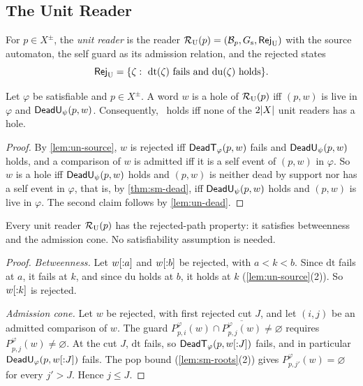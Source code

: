 \subsection{The Unit Reader}\label{sec:un-reader}

\begin{definition}\label{def:un-reader}
For $p\in X^\pm$, the \emph{unit reader} is the reader
$\mathcal R_{\mathrm U}(p)=(\mathcal B_p,G_{\mathrm{s}},\mathsf{Rej}_{\mathrm U})$ with the source automaton, the
self guard as its admission relation, and the rejected states
\[
 \mathsf{Rej}_{\mathrm U}=\{\zeta:\ \mathrm{dt}(\zeta)\text{ fails and }
 \mathrm{du}(\zeta)\text{ holds}\}.
\]
\end{definition}

\begin{lemma}\label{lem:un-holes}
Let $\varphi$ be satisfiable and $p\in X^\pm$. A word $w$ is a hole of
$\mathcal R_{\mathrm U}(p)$ iff $(p,w)$ is live in $\varphi$ and $\mathsf{DeadU}_\psi(p,w)$.
Consequently, \CondU\ holds iff none of the $2\lvert X\rvert$ unit readers has a hole.
\end{lemma}

\begin{proof}
By \cref{lem:un-source}, $w$ is rejected iff $\mathsf{DeadT}_\varphi(p,w)$ fails and
$\mathsf{DeadU}_\psi(p,w)$ holds, and a comparison of $w$ is admitted iff it is a self
event of $(p,w)$ in $\varphi$. So $w$ is a hole iff $\mathsf{DeadU}_\psi(p,w)$ holds
and $(p,w)$ is neither dead by support nor has a self event in $\varphi$, that
is, by \cref{thm:sm-dead}, iff $\mathsf{DeadU}_\psi(p,w)$ holds and $(p,w)$ is live in
$\varphi$. The second claim follows by \cref{lem:un-dead}.
\end{proof}

\begin{lemma}\label{lem:un-rejected-path}
Every unit reader $\mathcal R_{\mathrm U}(p)$ has the rejected-path property: it satisfies
betweenness and the admission cone. No satisfiability assumption is needed.
\end{lemma}

\begin{proof}
\emph{Betweenness.} Let $w[{:}a]$ and $w[{:}b]$ be rejected, with $a<k<b$.
Since $\mathrm{dt}$ fails at $a$, it fails at $k$, and since $\mathrm{du}$
holds at $b$, it holds at $k$ (\cref{lem:un-source}(2)). So $w[{:}k]$ is
rejected.

\emph{Admission cone.} Let $w$ be rejected, with first rejected cut $J$, and
let $(i,j)$ be an admitted comparison of $w$. The guard
$P^\varphi_{p,i}(w)\cap\overline{P^\varphi_{p,j}(w)}\ne\varnothing$ requires
$P^\varphi_{p,j}(w)\ne\varnothing$. At the cut $J$, $\mathrm{dt}$ fails, so
$\mathsf{DeadT}_\varphi(p,w[{:}J])$ fails, and in particular
$\mathsf{DeadU}_\varphi(p,w[{:}J])$ fails. The pop bound (\cref{lem:sm-roots}(2)) gives
$P^\varphi_{p,j'}(w)=\varnothing$ for every $j'>J$. Hence $j\le J$.
\end{proof}

